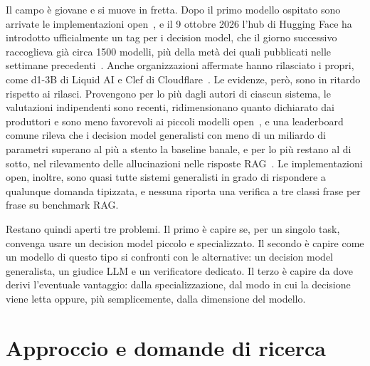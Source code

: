 Il campo è giovane e si muove in fretta. Dopo il primo modello ospitato sono arrivate le implementazioni
open~\cite{semif,rizzoflow}, e il 9 ottobre 2026 l'hub di Hugging Face ha introdotto ufficialmente un tag per i
decision model, che il giorno successivo raccoglieva già circa 1500 modelli, più della metà dei quali pubblicati
nelle settimane precedenti~\cite{hf2026decisionmodels}. Anche organizzazioni affermate
hanno rilasciato i propri, come d1-3B di Liquid AI e Clef di Cloudflare~\cite{liquid2026d1,cloudflare2026clef}. Le
evidenze, però, sono in ritardo rispetto ai rilasci. Provengono per lo più dagli autori di ciascun sistema, le valutazioni indipendenti sono recenti, ridimensionano quanto dichiarato dai produttori e sono meno favorevoli ai piccoli modelli open~\cite{deusser2026jev,nandakishore2026laya}, e una leaderboard comune
rileva che i decision model generalisti con meno di un miliardo di parametri superano al più a stento la baseline banale, e per lo più restano al di sotto, nel
rilevamento delle allucinazioni nelle risposte RAG~\cite{decisionindex2026}. Le implementazioni open, inoltre, sono quasi tutte sistemi generalisti in grado di rispondere a qualunque domanda tipizzata, e nessuna riporta una verifica a tre classi frase per frase su benchmark RAG.

Restano quindi aperti tre problemi. Il primo è capire se, per un singolo task, convenga usare un decision model piccolo e
specializzato. Il secondo è capire come un modello di questo tipo si confronti con le alternative: un decision model
generalista, un giudice LLM e un verificatore dedicato. Il terzo è capire da dove derivi l'eventuale vantaggio: dalla
specializzazione, dal modo in cui la decisione viene letta oppure, più semplicemente, dalla dimensione del modello.

\section{Approccio e domande di ricerca}
\label{sec:intro-rq}

